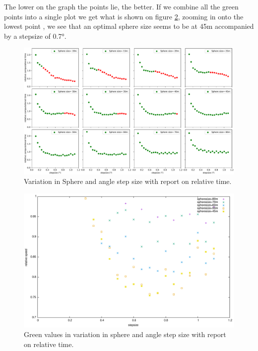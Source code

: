 \documentclass[11pt,a4paper,faculty=we,language=en,doctype=report]{cls/ugent-doc}
\begin{document}
The lower on the graph the points lie, the better. If we combine all the green points into a single plot
we get what is shown on figure \ref{fig:SphereStepFinal},
zooming in onto the lowest point , we see that an optimal sphere size seems to be at 45m accompanied
by a stepsize of 0.7°.
\begin{figure}
	\includegraphics[width=\textwidth]{figures/subplotofallstepsphere.pdf}
	\caption{Variation in Sphere and angle step size with report on relative time.}
	\label{fig:SphereStepInfl}
\end{figure}
\begin{figure}
	\includegraphics[width=\textwidth]{figures/SphereAndStepFinal.pdf}
	\caption{Green values in variation in sphere and angle step size with report on relative time.}
	\label{fig:SphereStepFinal}
\end{figure}
\newpage
\end{document}
